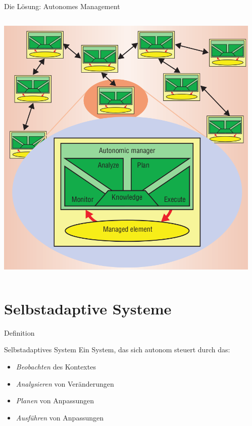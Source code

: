\documentclass[de,16:9]{sdqbeamer}
\begin{document}
\begin{frame}{Die Lösung: Autonomes Management}
	\begin{columns}
		 \begin{center}
			\includegraphics[height=0.7\textheight]{sources/MAPEK.png}
		\end{center}
		 \cite{VisionOfAutonomicComputing}
	\end{columns}
\end{frame}

\section{Selbstadaptive Systeme}

\begin{frame}{Definition}
	\begin{greenblock}{Selbstadaptives System}
		Ein System, das sich autonom steuert durch das:
		\begin{itemize}
			\item \textit{Beobachten} des Kontextes
			\item \textit{Analysieren} von Veränderungen
			\item \textit{Planen} von Anpassungen
			\item \textit{Ausführen} von Anpassungen
		\end{itemize}
	\end{greenblock}
\end{frame}
\end{document}
